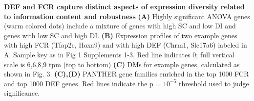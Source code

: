 \textbf{DEF and FCR capture distinct aspects of expression diversity related to information content and robustness} \textbf{(A)} Highly significant ANOVA genes (warm colored dots) include a mixture of genes with high SC and low DI and genes with low SC and high DI. \textbf{(B)} Expression profiles of two example genes with high FCR (Tfap2c, Hoxa9) and with high DEF (Chrm1, Slc17a6) labeled in A. Sample key as in Fig 1 Supplements 1-3. Red line indicates 0; full vertical scale is 6,6,8,9 tpm (top to bottom) \textbf{(C)} DMs for example genes, calculated as shown in Fig. 3. \textbf{(C),(D)} PANTHER gene families enriched in the top 1000 FCR and top 1000 DEF genes. Red lines indicate the p = $10^{-5}$ threshold used to judge significance.